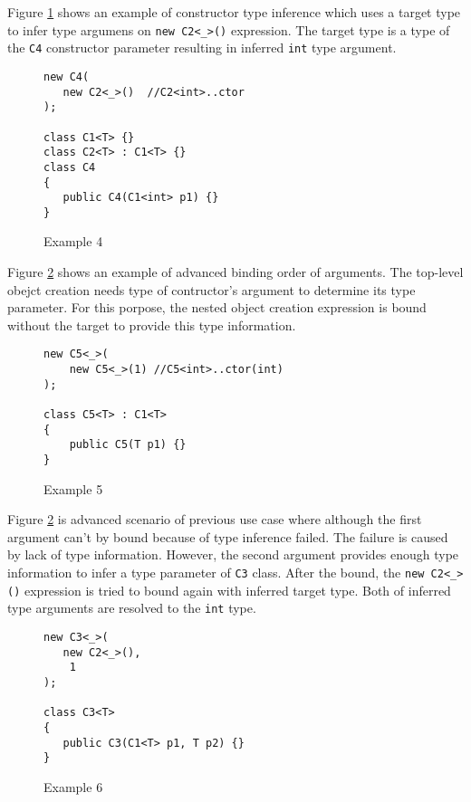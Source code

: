 \par
Figure \ref{img76:example4} shows an example of constructor type inference which uses a target type to infer type argumens on \texttt{new C2<\_>()} expression.
The target type is a type of the \texttt{C4} constructor parameter resulting in inferred \texttt{int} type argument.
\begin{figure}[h]
\begin{lstlisting}[style=csharp, showstringspaces=false]
new C4(
   new C2<_>()  //C2<int>..ctor
);

class C1<T> {}
class C2<T> : C1<T> {}
class C4 
{
   public C4(C1<int> p1) {}
}
\end{lstlisting}
\caption{Example 4}
\label{img76:example4}
\end{figure}
\par
Figure \ref{img77:example5} shows an example of advanced binding order of arguments.
The top-level obejct creation needs type of contructor's argument to determine its type parameter.
For this porpose, the nested object creation expression is bound without the target to provide this type information.
\begin{figure}[h]
\begin{lstlisting}[style=csharp, showstringspaces=false]
new C5<_>(
    new C5<_>(1) //C5<int>..ctor(int)
);

class C5<T> : C1<T>
{
    public C5(T p1) {}
}
\end{lstlisting}
\caption{Example 5}
\label{img77:example5}
\end{figure}
\par
Figure \ref{img77:example5} is advanced scenario of previous use case where although the first argument can't by bound because of type inference failed.
The failure is caused by lack of type information.
However, the second argument provides enough type information to infer a type parameter of \texttt{C3} class.
After the bound, the \texttt{new C2<\_>()} expression is tried to bound again with inferred target type.
Both of inferred type arguments are resolved to the \texttt{int} type.
\begin{figure}[h]
\begin{lstlisting}[style=csharp, showstringspaces=false]
new C3<_>(
   new C2<_>(),
    1
);

class C3<T>
{
   public C3(C1<T> p1, T p2) {}
}
\end{lstlisting}
\caption{Example 6}
\label{img78:example6}
\end{figure}
\par
